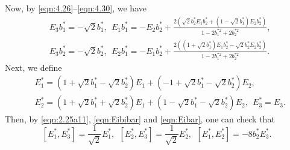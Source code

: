 \documentclass[reqno]{amsart}%
\theoremstyle{definition}
\numberwithin{equation}{section}
\begin{document}
Now, by \eqref{eqn:4.26}--\eqref{eqn:4.30}, we have
\begin{equation}\label{eqn:Eibibar}
\begin{aligned}
&E_3b_1^*=-\sqrt{2}b_1^*,\ \
E_1b_1^*=-E_2b_2^*+\frac{2(\sqrt{2}b_2^*E_1b_2^*+(1-\sqrt{2}b_1^*)E_2b_2^*)}{1-2b_1^{*2}+2b_2^{*2}},\\
&E_3b_2^*=-\sqrt{2}b_2^*,\ \ E_2b_1^*=-E_1b_2^*+\frac{2((1+\sqrt{2}b_1^*)E_1b_2^*-\sqrt{2}b_2^*E_2b_2^*)}{1-2b_1^{*2}+2b_2^{*2}}.
\end{aligned}
\end{equation}
Next, we define
\begin{equation}\label{eqn:Eibar}
\begin{aligned}
&E_1^*=(1+\sqrt{2}b_1^{*}-\sqrt{2}b_2^{*})E_1+(-1+\sqrt{2}b_1^{*}-\sqrt{2}b_2^{*})E_2,\\
&E_2^*=(1+\sqrt{2}b_1^{*}+\sqrt{2}b_2^{*})E_1+(1-\sqrt{2}b_1^{*}-\sqrt{2}b_2^{*})E_2,\ \
E_3^*=E_3.
\end{aligned}
\end{equation}
Then, by \eqref{eqn:2.25a11}, \eqref{eqn:Eibibar} and \eqref{eqn:Eibar}, one can check that
\begin{equation}\label{eqn:LieEibar}
[E_1^*,E_3^*]=\frac{1}{\sqrt{2}}E_1^*,\ \ [E_2^*,E_3^*]=\frac{1}{\sqrt{2}}E_2^*,\ \
[E_1^*,E_2^*]=-8b_2^*E_3^*.
\end{equation}
\end{document}

